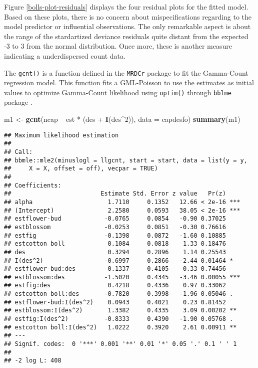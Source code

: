 \documentclass[9pt,a5paper,]{book}
\newenvironment{Shaded}{}{}
\newcommand{\KeywordTok}[1]{\textbf{{#1}}}
\newcommand{\DataTypeTok}[1]{\underline{{#1}}}
\newcommand{\DecValTok}[1]{{#1}}
\newcommand{\StringTok}[1]{{#1}}
\newcommand{\NormalTok}[1]{{#1}}
\renewenvironment{Shaded}{\color{inputcolor}}{}
\renewcommand{\DataTypeTok}[1]{{#1}}
\theoremstyle{definition}
\theoremstyle{definition}
\theoremstyle{remark}
\begin{document}
Figure \ref{bolls-plot-residuals} displays the four residual plots for
the fitted model. Based on these plots, there is no concern about
mispecifications regarding to the model predictor or influential
observations. The only remarkable aspect is about the range of the
stardartized deviance residuals quite distant from the expected -3 to 3
from the normal distribution. Once more, these is another measure
indicating a underdispersed count data.

The \texttt{gcnt()} is a function defined in the \texttt{MRDCr} package
\citep{mrdcr-pkg} to fit the Gamma-Count regression model. This function
fits a GML-Poisson to use the estimates as initial values to optimize
Gamma-Count likelihood using \texttt{optim()} through \texttt{bblme}
package \citep{bblme-pkg}.

\begin{Shaded}
\begin{Highlighting}[]
\NormalTok{m1 <-}\StringTok{ }\KeywordTok{gcnt}\NormalTok{(ncap ~}\StringTok{ }\NormalTok{est *}\StringTok{ }\NormalTok{(des +}\StringTok{ }\KeywordTok{I}\NormalTok{(des^}\DecValTok{2}\NormalTok{)),}
           \DataTypeTok{data =} \NormalTok{capdesfo)}
\KeywordTok{summary}\NormalTok{(m1)}
\end{Highlighting}
\end{Shaded}

\begin{verbatim}
## Maximum likelihood estimation
## 
## Call:
## bbmle::mle2(minuslogl = llgcnt, start = start, data = list(y = y, 
##     X = X, offset = off), vecpar = TRUE)
## 
## Coefficients:
##                         Estimate Std. Error z value   Pr(z)    
## alpha                     1.7110     0.1352   12.66 < 2e-16 ***
## (Intercept)               2.2580     0.0593   38.05 < 2e-16 ***
## estflower-bud            -0.0765     0.0854   -0.90 0.37025    
## estblossom               -0.0253     0.0851   -0.30 0.76616    
## estfig                   -0.1398     0.0872   -1.60 0.10885    
## estcotton boll            0.1084     0.0818    1.33 0.18476    
## des                       0.3294     0.2896    1.14 0.25543    
## I(des^2)                 -0.6997     0.2866   -2.44 0.01464 *  
## estflower-bud:des         0.1337     0.4105    0.33 0.74456    
## estblossom:des           -1.5020     0.4345   -3.46 0.00055 ***
## estfig:des                0.4218     0.4336    0.97 0.33062    
## estcotton boll:des       -0.7820     0.3998   -1.96 0.05046 .  
## estflower-bud:I(des^2)    0.0943     0.4021    0.23 0.81452    
## estblossom:I(des^2)       1.3382     0.4335    3.09 0.00202 ** 
## estfig:I(des^2)          -0.8333     0.4390   -1.90 0.05768 .  
## estcotton boll:I(des^2)   1.0222     0.3920    2.61 0.00911 ** 
## ---
## Signif. codes:  0 '***' 0.001 '**' 0.01 '*' 0.05 '.' 0.1 ' ' 1
## 
## -2 log L: 408
\end{verbatim}
\end{document}
